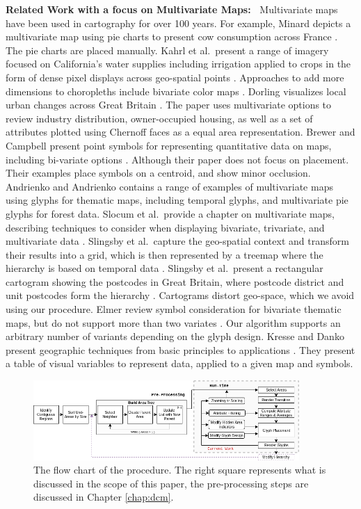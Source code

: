 \textbf{Related Work with a focus on Multivariate Maps:~} Multivariate maps have been used in cartography for over 100 years. For example, Minard depicts a multivariate map using pie charts to present cow consumption across France \cite{minard1858carte}. The pie charts are placed manually.
Kahrl et al.\ present a range of imagery focused on California's water supplies including irrigation applied to crops in the form of dense pixel displays across geo-spatial points \cite{kahrl1978california}. 
Approaches to add more dimensions to choropleths include bivariate color maps \cite{olson1981spectrally, dunn1989dynamic}.
Dorling visualizes local urban changes across Great Britain \cite{dorling1995visualization}. The paper uses multivariate options to review industry distribution, owner-occupied housing, as well as a set of attributes plotted using Chernoff faces as a equal area representation.
Brewer and Campbell present point symbols for representing quantitative data on maps, including bi-variate options \cite{brewer1998beyond}. Although their paper does not focus on placement. Their examples place symbols on a centroid, and show minor occlusion.
Andrienko and Andrienko \cite{andrienko2006exploratory} contains a range of examples of multivariate maps using glyphs for thematic maps, including temporal glyphs, and multivariate pie glyphs for forest data. 
Slocum et al.\ provide a chapter on multivariate maps, describing techniques to consider when displaying bivariate, trivariate, and multivariate data \cite{slocum2009thematic}. 
Slingsby et al.\ capture the geo-spatial context and transform their results into a grid, which is then represented by a treemap where the hierarchy is based on temporal data \cite{slingsby2010treemap}.
 Slingsby et al.\ present a rectangular cartogram showing the postcodes in Great Britain, where postcode district and unit postcodes form the hierarchy \cite{slingsby2010rectangular}. Cartograms distort geo-space, which we avoid using our procedure.
Elmer review symbol consideration for bivariate thematic maps, but do not support more than two variates \cite{elmer2012symbol}. Our algorithm supports an arbitrary number of variants depending on the glyph design.
Kresse and Danko present geographic techniques from basic principles to applications \cite{kresse2012springer}. They present a table of visual variables to represent data, applied to a given map and symbols.

\begin{figure}
\includegraphics[width=0.9\textwidth]{images/ch5/HorizontalFlow2}
\caption{The flow chart of the procedure. The right square represents what is discussed in the scope of this paper, the pre-processing steps are discussed in Chapter \ref{chap:dcm}.} \label{fig:procedure}
\end{figure}

